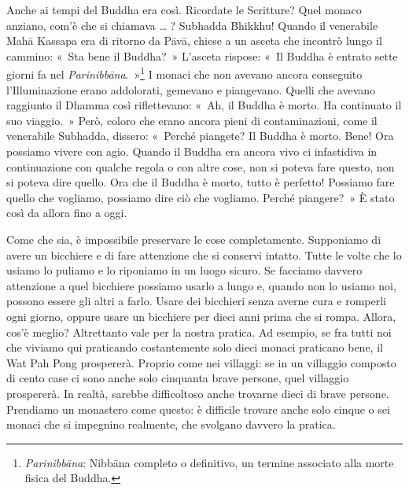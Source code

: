 Anche ai tempi del Buddha era così. Ricordate le Scritture? Quel monaco
anziano, com'è che si chiamava \ldots{} ? Subhadda Bhikkhu! Quando il
venerabile Mahā Kassapa era di ritorno da Pāvā, chiese a un asceta che
incontrò lungo il cammino: «~Sta bene il Buddha?~» L'asceta rispose:
«~Il Buddha è entrato sette giorni fa nel
\emph{Parinibbāna}.~»\footnote{\emph{Parinibbāna}: Nibbāna
  completo o definitivo, un termine associato alla morte fisica del
  Buddha.} I monaci che non avevano ancora conseguito l'Illuminazione
erano addolorati, gemevano e piangevano. Quelli che avevano raggiunto il
Dhamma così riflettevano: «~Ah, il Buddha è morto. Ha continuato il suo
viaggio.~» Però, coloro che erano ancora pieni di contaminazioni, come
il venerabile Subhadda, dissero: «~Perché piangete? Il Buddha è morto.
Bene! Ora possiamo vivere con agio. Quando il Buddha era ancora vivo ci
infastidiva in continuazione con qualche regola o con altre cose, non si
poteva fare questo, non si poteva dire quello. Ora che il Buddha è
morto, tutto è perfetto! Possiamo fare quello che vogliamo, possiamo
dire ciò che vogliamo. Perché piangere?~» È stato così da allora fino a
oggi.

Come che sia, è impossibile preservare le cose completamente. Supponiamo
di avere un bicchiere e di fare attenzione che si conservi intatto.
Tutte le volte che lo usiamo lo puliamo e lo riponiamo in un luogo
sicuro. Se facciamo davvero attenzione a quel bicchiere possiamo usarlo
a lungo e, quando non lo usiamo noi, possono essere gli altri a farlo.
Usare dei bicchieri senza averne cura e romperli ogni giorno, oppure
usare un bicchiere per dieci anni prima che si rompa. Allora, cos'è
meglio? Altrettanto vale per la nostra pratica. Ad esempio, se fra tutti
noi che viviamo qui praticando costantemente solo dieci monaci praticano
bene, il Wat Pah Pong prospererà. Proprio come nei villaggi: se in un
villaggio composto di cento case ci sono anche solo cinquanta brave
persone, quel villaggio prospererà. In realtà, sarebbe difficoltoso
anche trovarne dieci di brave persone. Prendiamo un monastero come
questo: è difficile trovare anche solo cinque o sei monaci che si
impegnino realmente, che svolgano davvero la pratica.

